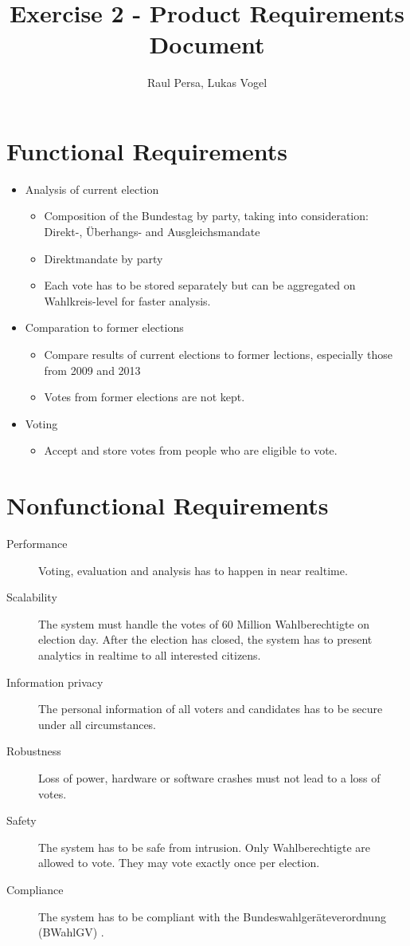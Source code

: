 \documentclass[10pt,a4paper]{article}
\author{Raul Persa, Lukas Vogel}
\title{Exercise 2 - Product Requirements Document}
\begin{document}
	\maketitle
	
	
	\section*{Functional Requirements}
	
	\begin{itemize}
		\item Analysis of current election
			\begin{itemize}
				\item Composition of the Bundestag by party, taking into consideration: Direkt-, \"Uberhangs- and Ausgleichsmandate
				\item Direktmandate by party
				\item Each vote has to be stored separately but can be aggregated on Wahlkreis-level for faster analysis.
			\end{itemize}
		\item Comparation to former elections
			\begin{itemize}
				\item Compare results of current elections to former lections, especially those from 2009 and 2013
				\item Votes from former elections are not kept.
			\end{itemize}
		\item Voting
			\begin{itemize}
				\item Accept and store votes from people who are eligible to vote.
			\end{itemize}
	\end{itemize}
	
	\section*{Nonfunctional Requirements}
	
	\begin{description}
		\item[Performance] Voting, evaluation and analysis has to happen in near realtime.
		\item[Scalability] The system must handle the votes of 60 Million Wahlberechtigte on election day. 
		After the election has closed, the system has to present analytics in realtime to all interested citizens.
		\item[Information privacy] The personal information of all voters and candidates has to be secure under all circumstances.
		\item[Robustness] Loss of power, hardware or software crashes must not lead to a loss of votes.
		\item[Safety] The system has to be safe from intrusion. Only Wahlberechtigte are allowed to vote. They may vote exactly once per election.
		\item[Compliance] The system has to be compliant with the Bundeswahlger\"ateverordnung (BWahlGV) .
	\end{description}
	
\end{document}
